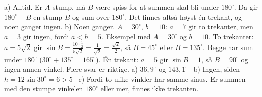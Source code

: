  a) Alltid. Er $A$ stump, må $B$ være spiss for at summen skal bli under $180^\circ$. Da gir $180^\circ - B$ en stump $B$ og sum over $180^\circ$. Det finnes altså høyst én trekant, og noen ganger ingen.
b) Noen ganger. $A = 30^\circ$, $b = 10$: $a = 7$ gir to trekanter, men $a = 3$ gir ingen, fordi $a < h = 5$.
 Eksempel med $A = 30^\circ$ og $b = 10$. To trekanter: $a = 5\sqrt2$ gir $\sin B = \frac{10 \cdot \frac12}{5\sqrt2} = \frac{1}{\sqrt2} = \frac{\sqrt2}{2}$, så $B = 45^\circ$ eller $B = 135^\circ$. Begge har sum under $180^\circ$ ($30^\circ + 135^\circ = 165^\circ$). Én trekant: $a = 5$ gir $\sin B = 1$, så $B = 90^\circ$ og ingen annen vinkel. Flere svar er riktige.
 a) $36,9^\circ$ og $143,1^\circ$ \ b) Ingen, siden $h = 12\sin 30^\circ = 6 > 5$ \ c) Fordi to ulike vinkler har samme sinus. Er summen med den stumpe vinkelen $180^\circ$ eller mer, finnes ikke trekanten.

